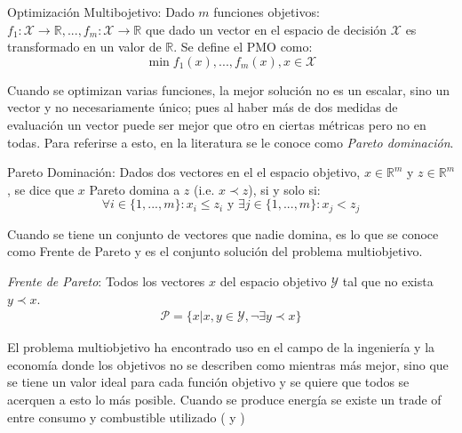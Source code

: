 \begin{definition}{Optimizaci\'on Multibojetivo:}
     Dado $m$ funciones objetivos: $f_1: \mathcal{X} \rightarrow \mathbb{R}, ..., f_m: \mathcal{X} \rightarrow \mathbb{R}$ que dado un vector en el espacio de decisi\'on $\mathcal{X}$ es transformado en un valor de $\mathbb{R}$. Se define el PMO como:
    \begin{equation*}
        \min f_1(x), ..., f_m(x), x \in \mathcal{X}
    \end{equation*}
\end{definition}

Cuando se optimizan varias funciones, la mejor soluci\'on  no es un escalar, sino un vector y no necesariamente \'unico; pues al haber m\'as de dos medidas de evaluaci\'on un vector puede ser mejor que otro en ciertas m\'etricas pero no en todas. Para referirse a esto, en la literatura se le conoce como \textit{Pareto dominaci\'on}.

\begin{definition}{Pareto Dominaci\'on:}
    Dados dos vectores en el el espacio objetivo, $x \in \mathbb{R}^m$ y $z \in \mathbb{R}^m$, se dice que $x$ Pareto domina a $z$ (i.e. $x \prec z$), si y solo si:
    \begin{equation*}
        \forall i \in \{1, ..., m\}: x_i \leq z_i \text{ y } \exists j \in \{1, ..., m\}: x_j < z_j
    \end{equation*}
\end{definition}

Cuando se tiene un conjunto de vectores que nadie domina, es lo que se conoce como Frente de Pareto y es el conjunto soluci\'on del problema multiobjetivo.

\begin{definition}
    \textit{Frente de Pareto}: Todos los vectores $x$ del espacio objetivo $\mathcal{Y}$ tal que no exista $y \prec x$.
    \begin{align*}
        \mathcal{P} = \{x| x, y \in \mathcal{Y}, \neg \exists y \prec x \} 
    \end{align*}
\end{definition}


El problema multiobjetivo ha encontrado uso en el campo de la ingenier\'ia y la econom\'ia donde los objetivos no se describen como mientras m\'as mejor, sino que se tiene un valor ideal para cada funci\'on objetivo y se quiere que todos se acerquen a esto lo m\'as posible. Cuando se produce energ\'ia se existe un trade of entre consumo  y combustible utilizado (\cite{shirazi2012thermal} y \cite{shirazi2014thermal})

